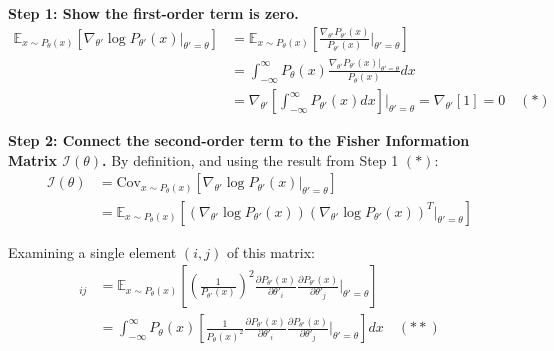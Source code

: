 \begin{solution}
\begin{itemize}
              \textbf{Step 1: Show the first-order term is zero.}
              \begin{align*}
                  \mathbb{E}_{x \sim P_\theta(x)} \left[ \nabla_{\theta'} \log P_{\theta'}(x) \Big|_{\theta'=\theta} \right] & = \mathbb{E}_{x \sim P_\theta(x)} \left[ \frac{\nabla_{\theta'} P_{\theta'}(x)}{P_{\theta'}(x)} \Bigg|_{\theta'=\theta} \right]         \\
                                                                                                                             & = \int_{-\infty}^{\infty} P_\theta(x) \frac{\nabla_{\theta'} P_{\theta'}(x) \Big|_{\theta'=\theta}}{P_\theta(x)} dx                     \\
                                                                                                                             & = \nabla_{\theta'} \left[ \int_{-\infty}^{\infty} P_{\theta'}(x) dx \right] \Bigg|_{\theta'=\theta} = \nabla_{\theta'}[1] = 0 \quad (*)
              \end{align*}

              \textbf{Step 2: Connect the second-order term to the Fisher Information Matrix $\mathcal{I}(\theta)$.}
              By definition, and using the result from Step 1 $(*)$:
              \begin{align*}
                  \mathcal{I}(\theta) & = \text{Cov}_{x \sim P_\theta(x)} \left[ \nabla_{\theta'} \log P_{\theta'}(x) \Big|_{\theta'=\theta} \right]                                                                  \\
                                      & = \mathbb{E}_{x \sim P_\theta(x)} \left[ \left(\nabla_{\theta'} \log P_{\theta'}(x)\right) \left(\nabla_{\theta'} \log P_{\theta'}(x)\right)^T \Big|_{\theta'=\theta} \right]
              \end{align*}

              Examining a single element $(i, j)$ of this matrix:
              \begin{align*}
                  [\mathcal{I}(\theta)]_{ij} & = \mathbb{E}_{x \sim P_\theta(x)} \left[ \left( \frac{1}{P_{\theta'}(x)} \right)^2 \frac{\partial P_{\theta'}(x)}{\partial \theta'_i} \frac{\partial P_{\theta'}(x)}{\partial \theta'_j} \Bigg|_{\theta'=\theta} \right] \\
                                             & = \int_{-\infty}^{\infty} P_\theta(x) \left[ \frac{1}{P_\theta(x)^2} \frac{\partial P_{\theta'}(x)}{\partial \theta'_i} \frac{\partial P_{\theta'}(x)}{\partial \theta'_j} \Bigg|_{\theta'=\theta} \right] dx \quad (**)
              \end{align*}


\end{itemize}
\end{solution}
